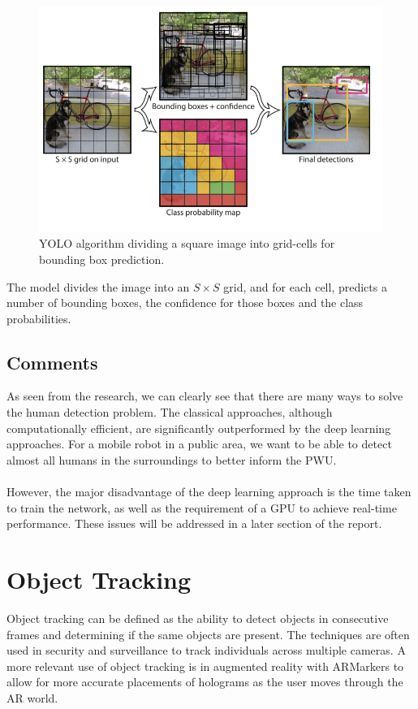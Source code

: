 \begin{figure}[ht]
	\centering
	\includegraphics[width=.6\linewidth]{img/chapter2_background/yoloApproach.png}
	\caption{YOLO algorithm dividing a square image into grid-cells for bounding box prediction.}
\end{figure}

The model divides the image into an $S \times S$ grid, and for each cell, predicts a number of bounding boxes, the confidence for those boxes and the class probabilities.

\subsection{Comments} \label{sec:detector}
As seen from the research, we can clearly see that there are many ways to solve the human detection problem. The classical approaches, although computationally efficient, are significantly outperformed by the deep learning approaches. For a mobile robot in a public area, we want to be able to detect almost all humans in the surroundings to better inform the PWU.

\paragraph{}However, the major disadvantage of the deep learning approach is the time taken to train the network, as well as the requirement of a GPU to achieve real-time performance. These issues will be addressed in a later section of the report.

\section{Object Tracking}
Object tracking can be defined as the ability to detect objects in consecutive frames and determining if the same objects are present. The techniques are often used in security and surveillance to track individuals across multiple cameras. A more relevant use of object tracking is in augmented reality with ARMarkers to allow for more accurate placements of holograms as the user moves through the AR world.

